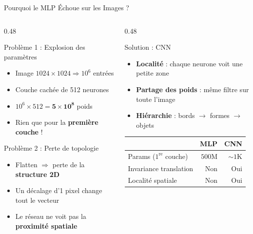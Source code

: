 \documentclass[aspectratio=169, 10pt]{beamer}
\begin{document}
\begin{frame}{Pourquoi le MLP Échoue sur les Images ?}
  \begin{columns}[T]
    \begin{column}{0.48\textwidth}
      \begin{alertblock}{Problème 1 : Explosion des paramètres}
        \begin{itemize}
          \item Image $1024 \times 1024 \Rightarrow 10^6$ entrées
          \item Couche cachée de 512 neurones
          \item $10^6 \times 512 = \mathbf{5 \times 10^8}$ poids
          \item Rien que pour la \textbf{première couche} !
        \end{itemize}
      \end{alertblock}
      \smallskip
      \begin{alertblock}{Problème 2 : Perte de topologie}
        \begin{itemize}
          \item Flatten $\Rightarrow$ perte de la \textbf{structure 2D}
          \item Un décalage d'1 pixel change tout le vecteur
          \item Le réseau ne voit pas la \textbf{proximité spatiale}
        \end{itemize}
      \end{alertblock}
    \end{column}
    \begin{column}{0.48\textwidth}
      \begin{exampleblock}{Solution : CNN}
        \begin{itemize}
          \item \textbf{Localité} : chaque neurone voit une petite zone
          \item \textbf{Partage des poids} : même filtre sur toute l'image
          \item \textbf{Hiérarchie} : bords $\to$ formes $\to$ objets
        \end{itemize}
      \end{exampleblock}
      \smallskip
      \begin{center}
        \renewcommand{\arraystretch}{1.3}
        \begin{tabular}{lrr}
          \toprule
           & \textbf{MLP} & \textbf{CNN} \\
          \midrule
          Params ($1^{\text{re}}$ couche) & $500\text{M}$ & $\sim 1\text{K}$ \\
          Invariance translation & Non & Oui \\
          Localité spatiale & Non & Oui \\
          \bottomrule
        \end{tabular}
      \end{center}
    \end{column}
  \end{columns}
\end{frame}
\end{document}
